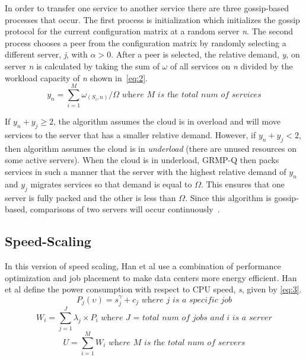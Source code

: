 \documentclass{sig-alternate}
\begin{document}
In order to transfer one service to another service there are three gossip-based processes that occur. The first process is initialization which initializes the gossip protocol for the current configuration matrix at a random server \emph{n}.  The second process chooses a peer from the configuration matrix by randomly selecting a different server, \emph{j}, with $\alpha > 0$. After a peer is selected, the relative demand, \emph{y}, on server \emph{n} is calculated by taking the sum of \emph{$\omega$} of all services on \emph{n} divided by the workload capacity of \emph{n} shown in~\eqref{eq:2}.
\begin{equation}
y_n = \sum_{i=1}^M \omega_{(S_i,n)}/\Omega \textit{~where M is the total num of services}\label{eq:2}
\end{equation}

If $y_n + y_j \geq 2$, the algorithm assumes the cloud is in overload and will move services to the server that has a smaller relative demand. However, if $y_n + y_j < 2$, then algorithm assumes the cloud is in \emph{underload} (there are unused resources on some active servers). When the cloud is in underload, GRMP-Q then packs services in such a manner that the server with the highest relative demand of $y_n$ and $y_j$ migrates services so that demand is equal to $\Omega$. This ensures that one server is fully packed and the other is less than $\Omega$. Since this algorithm is gossip-based,  comparisons of two servers will occur continuously~\cite{Yanggratoke}.  



\subsection{Speed-Scaling}
\label{sec:Speed}
In this version of speed scaling, Han et al use a combination of performance optimization and job placement to make data centers more energy efficient. Han et al define the power consumption with respect to CPU speed, \emph{s}, given by \eqref{eq:3}. 
\begin{equation}
P_{j}(\upsilon) = s_{j}^{\gamma}+ c_j \textit{~where j is a specific job}\label{eq:3}
\end{equation}
\begin{equation}
W_{i} =\sum_{j=1}^J \lambda_{j} \times P_{i}\textit{~where J = total num of jobs and i is a server}\label{eq:4}
\end{equation}
\begin{equation}
U =\sum_{i=1}^M W_{i} \textit{~where M is the total num of servers}\label{eq:5}
\end{equation}
\end{document}
